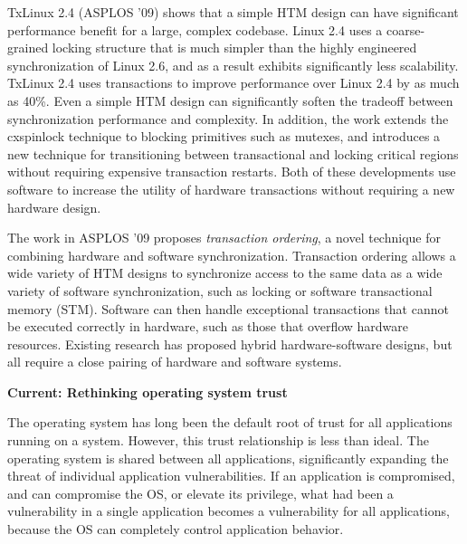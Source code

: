 \documentclass{article}
\newcommand{\codeid}[1]{{\fontsize{9pt}{12pt}\tt #1}}
\begin{document}
TxLinux 2.4 (ASPLOS ’09) shows that a simple HTM design can have
significant performance benefit for a large, complex codebase. Linux 2.4
uses a coarse-grained locking structure that is much simpler than the
highly engineered synchronization of Linux 2.6, and as a result exhibits
significantly less scalability. TxLinux 2.4 uses transactions to improve
performance over Linux 2.4 by as much as 40\%. Even a simple HTM design can
significantly soften the tradeoff between synchronization performance and
complexity. In addition, the work extends the cxspinlock technique to
blocking primitives such as mutexes, and introduces a new technique for
transitioning between transactional and locking critical regions without
requiring expensive transaction restarts. Both of these developments use
software to increase the utility of hardware transactions without requiring
a new hardware design.

The work in ASPLOS ’09 proposes \emph{transaction ordering}, a novel
technique for combining hardware and software synchronization. Transaction
ordering allows a wide variety of HTM designs to synchronize access to the
same data as a wide variety of software synchronization, such as locking or
software transactional memory (STM). Software can then handle exceptional
transactions that cannot be executed correctly in hardware, such as those
that overflow hardware resources. Existing research has proposed hybrid
hardware-software designs, but all require a close pairing of hardware and
software systems.


{\bigskip \noindent \bf Current: Rethinking operating system trust}

\noindent The operating system has long been the default root of trust for
all applications running on a system. However, this trust relationship is
less than ideal. The operating system is shared between all applications,
significantly expanding the threat of individual application
vulnerabilities. If an application is compromised, and can compromise the
OS, or elevate its privilege, what had been a vulnerability in a single
application becomes a vulnerability for all applications, because the OS
can completely control application behavior.

\end{document}

